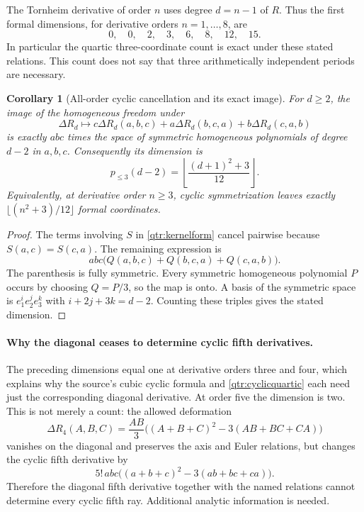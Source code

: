 \documentclass[11pt,a4paper]{article}
\numberwithin{equation}{section}
\newtheorem{corollary}[theorem]{Corollary}
\theoremstyle{definition}
\theoremstyle{remark}
\begin{document}
The Tornheim derivative of order \(n\) uses degree \(d=n-1\)
of \(R\). Thus the first formal dimensions, for derivative
orders \(n=1,\ldots,8\), are
\[
 0,\quad0,\quad2,\quad3,\quad6,\quad8,\quad12,\quad15.
\]
In particular the quartic three-coordinate count is exact under
these stated relations. This count does not say that three
arithmetically independent periods are necessary.

\begin{corollary}[All-order cyclic cancellation and its exact image]
\label{qtr:cyclicimage}
For \(d\ge2\), the image of the homogeneous freedom under
\[
 \Delta R_d\longmapsto
 c\Delta R_d(a,b,c)+a\Delta R_d(b,c,a)
                         +b\Delta R_d(c,a,b)
\]
is exactly \(abc\) times the space of symmetric homogeneous
polynomials of degree \(d-2\) in \(a,b,c\). Consequently its
dimension is
\[
 p_{\le3}(d-2)=
 \left\lfloor\frac{(d+1)^2+3}{12}\right\rfloor.
\]
Equivalently, at derivative order \(n\ge3\), cyclic
symmetrization leaves exactly
\(\lfloor(n^2+3)/12\rfloor\) formal coordinates.
\end{corollary}

\begin{proof}
The terms involving \(S\) in \eqref{qtr:kernelform} cancel
pairwise because \(S(a,c)=S(c,a)\). The remaining expression is
\[
 abc\bigl(Q(a,b,c)+Q(b,c,a)+Q(c,a,b)\bigr).
\]
The parenthesis is fully symmetric. Every symmetric
homogeneous polynomial \(P\) occurs by choosing \(Q=P/3\),
so the map is onto. A basis of the symmetric space is
\(e_1^i e_2^j e_3^k\) with \(i+2j+3k=d-2\).
Counting these triples gives the stated dimension.
\end{proof}

\paragraph{Why the diagonal ceases to determine cyclic fifth derivatives.}
The preceding dimensions equal one at derivative orders three
and four, which explains why the source's cubic cyclic formula
and \eqref{qtr:cyclicquartic} each need just the corresponding
diagonal derivative. At order five the dimension is two.
This is not merely a count: the allowed deformation
\[
 \Delta R_4(A,B,C)=\frac{AB}{3}
 \bigl((A+B+C)^2-3(AB+BC+CA)\bigr)
\]
vanishes on the diagonal and preserves the axis and Euler
relations, but changes the cyclic fifth derivative by
\[
 5!\,abc\bigl((a+b+c)^2-3(ab+bc+ca)\bigr).
\]
Therefore the diagonal fifth derivative together with the
named relations cannot determine every cyclic fifth ray.
Additional analytic information is needed.
\end{document}
